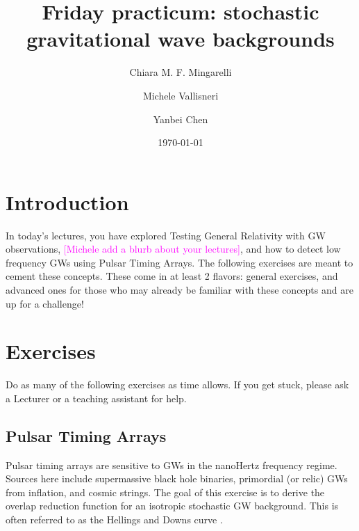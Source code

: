 \documentclass[article, onecolumn, ,nofootinbib,nopreprintnumbers]{revtex4}
\newcommand{\cm}{\textcolor{magenta}}
\begin{document}
\title{Friday practicum: stochastic gravitational wave backgrounds}
\author{Chiara M. F. Mingarelli}
\author{Michele Vallisneri}
\author{Yanbei Chen}

\date\today
\maketitle

\section{Introduction}
In today's lectures, you have explored Testing General Relativity with GW observations, \cm{[Michele add a blurb about your lectures]}, and how to detect low frequency GWs using Pulsar Timing Arrays. The following exercises are meant to cement these concepts. These come in at least 2 flavors: general exercises, and advanced ones for those who may already be familiar with these concepts and are up for a challenge! 

\section{Exercises}
Do as many of the following exercises as time allows. If you get stuck, please ask a Lecturer or a teaching assistant for help.

\subsection{Pulsar Timing Arrays}
Pulsar timing arrays are sensitive to GWs in the nanoHertz frequency regime. Sources here include supermassive black hole binaries, primordial (or relic) GWs from inflation, and cosmic strings. The goal of this exercise is to derive the overlap reduction function for an isotropic stochastic GW background. This is often referred to as the Hellings and Downs curve \cite{HellingsDowns:1983}.
\end{document}
